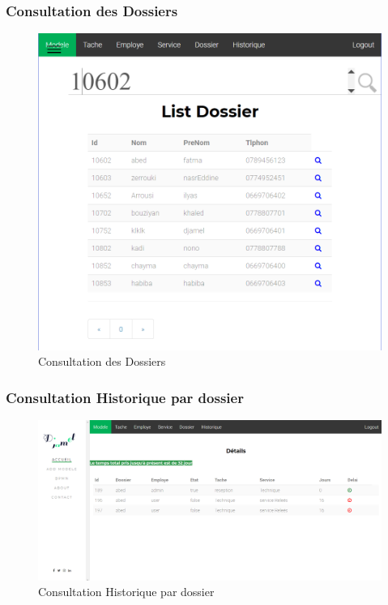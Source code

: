 \subsubsection{Consultation des  Dossiers}
\begin{figure}[H]
	\centering
	\includegraphics[width=0.7\linewidth]{images/captures/capturesadmin/dossier}
	\caption{Consultation des  Dossiers}
	\label{fig:dossier}
\end{figure}






\subsubsection{ Consultation Historique par dossier }
\begin{figure}[H]
	\centering
	\includegraphics[width=1\linewidth]{images/captures/capturesadmin/historique}
	\caption{Consultation Historique par dossier }
	\label{fig:historique}
\end{figure}


